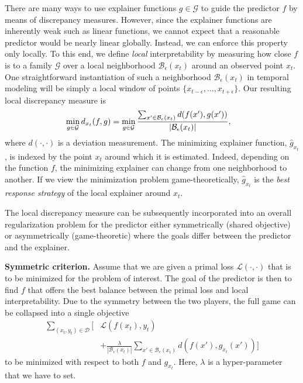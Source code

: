 There are many ways to use explainer functions $g \in \mathcal{G}$ to guide the predictor $f$ by means of discrepancy measures. However, since the explainer functions are inherently weak such as linear functions, we cannot expect that a reasonable predictor would be nearly linear globally. Instead, we can enforce this property only locally. To this end, we define \emph{local} interpretability by measuring how close $f$ is to a family $\mathcal{G}$ over a local neighborhood $\mathcal{B}_\epsilon(x_t)$ around an observed point $x_t$. One straightforward instantiation of such a neighborhood $\mathcal{B}_\epsilon({x_t})$ in temporal modeling will be simply a local window of points $\{x_{t-\epsilon},\dots, x_{t+\epsilon}\}$. Our resulting local discrepancy measure is
\begin{align}
\vspace{1mm}
& \min_{g \in \mathcal{G}} d_{x_t}(f, g)  = \min_{g \in \mathcal{G}} \frac{\sum_{x' \in \mathcal{B}_\epsilon(x_t)} d(f(x'), g(x'))}{|\mathcal{B}_\epsilon({x_t})|},
\label{eq:local_deviation}
\vspace{1mm}
\end{align}
where $d(\cdot, \cdot)$ is a deviation measurement.
The minimizing explainer function, $\hat g_{x_t}$, is indexed by the point $x_t$ around which it is estimated. Indeed, depending on the function $f$, the minimizing explainer can change from one neighborhood to another. If we view the minimization problem game-theoretically, $\hat g_{x_t}$ is the \emph{best response strategy} of the local explainer around $x_t$. 
  
The local discrepancy measure can be subsequently incorporated into an overall regularization problem for the predictor either symmetrically (shared objective) or asymmetrically (game-theoretic) where the goals differ between the predictor and the explainer.  

{\bf Symmetric criterion.} Assume that we are given a primal loss $\mathcal{L}(\cdot, \cdot)$ that is to be minimized for the problem of interest. The goal of the predictor is then to find $f$ that offers the best balance between the primal loss and local interpretability. 
Due to the symmetry between the two players, the full game can be collapsed into a single objective
\begin{align}
\sum_{(x_t, y_t) \in \mathcal{D}}
\bigg[& \mathcal{L}(f(x_t), y_t) \nonumber\\
& + \frac{\lambda}{|\mathcal{B}_\epsilon(x_t)|} \sum_{x' \in \mathcal{B}_\epsilon(x_t)} d(f(x'), g_{x_t}(x'))\bigg]
\end{align}
to be minimized with respect to both $f$ and $g_{x_t}$. Here, $\lambda$ is a hyper-parameter that we have to set.

